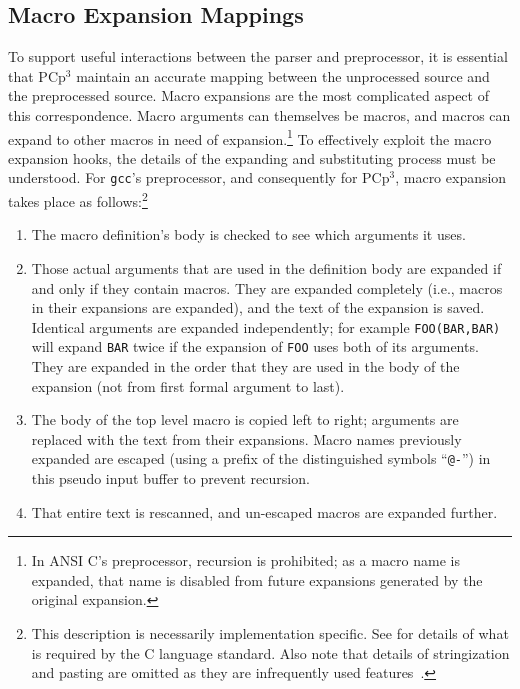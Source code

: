 \documentclass{article}
\newcommand{\pcp}{\mbox{\textsf{PCp}$^3$}}
\newcommand{\C}{\mbox{C}}
\newcommand{\ie}{i.e.,}
\begin{document}
\subsection{Macro Expansion Mappings}
\label{ssec:macro_exp_map}
To support useful interactions between the parser and preprocessor, it
is essential that \pcp{} maintain an accurate mapping between the
unprocessed source and the preprocessed source.  Macro expansions are
the most complicated aspect of this correspondence.  Macro arguments can
themselves be macros, and macros can expand to other macros in need of
expansion.\footnote{In ANSI \C{}'s preprocessor, recursion is
  prohibited; as a macro name is expanded, that name is disabled from
  future expansions generated by the original expansion.}  To
effectively exploit the macro expansion hooks, the details of the
expanding and substituting process must be understood.  For
\texttt{gcc}'s preprocessor, and consequently for \pcp{}, macro
expansion takes place as follows:\footnote{This description is necessarily
  implementation specific.  See \cite[Ch.~3]{Harbison91} for details of
  what is required by the \C{} language standard.  Also note that
  details of stringization and pasting are omitted as they are
  infrequently used features~\cite{EmpCpp}.}

\begin{enumerate}
\item The macro definition's body is checked to see which arguments it uses.
\item Those actual arguments that are used in the definition body are
      expanded if and only if they contain macros.  They are expanded
      completely (\ie{} macros in their expansions are expanded), and
      the text of the expansion is saved.  Identical arguments are
      expanded independently; for example \texttt{FOO(BAR,BAR)} will
      expand \texttt{BAR} twice if the expansion of \texttt{FOO} uses
      both of its arguments.  They are expanded in the order that they
      are used in the body of the expansion (not from first formal
      argument to last).
\item The body of the top level macro is copied left to right; arguments
      are replaced with the text from their expansions.  Macro names
      previously expanded are escaped (using a prefix of the
      distinguished symbols ``\texttt{@-}'') in this pseudo input buffer
      to prevent recursion.
\item That entire text is rescanned, and un-escaped macros are expanded
      further.
\end{enumerate}
\end{document}
